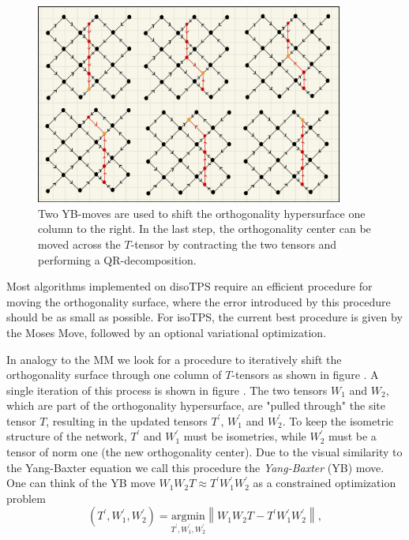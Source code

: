 \begin{figure}
	\centering
	\includegraphics[width=0.9\textwidth]{figures/Tensor_Networks/disoTPS_moving_ortho_surface.jpeg}
	\caption{Two YB-moves are used to shift the orthogonality hypersurface one column to the right. In the last step, the orthogonality center can be moved across the $T$-tensor by contracting the two tensors and performing a QR-decomposition.}
	\label{fig:disoTPS_moving_ortho_surface}
\end{figure}
Most algorithms implemented on disoTPS require an efficient procedure for moving the orthogonality surface, where the error introduced by this procedure should be as small as possible. For isoTPS, the current best procedure is given by the Moses Move, followed by an optional variational optimization. \par
In analogy to the MM we look for a procedure to iteratively shift the orthogonality surface through one column of $T$-tensors as shown in figure \figref{}. A single iteration of this process is shown in figure \figref{}. The two tensors $W_1$ and $W_2$, which are part of the orthogonality hypersurface, are "pulled through" the site tensor $T$, resulting in the updated tensors $T^\prime$, $W_1^\prime$ and $W_2^\prime$. To keep the isometric structure of the network, $T^\prime$ and $W_1^\prime$ must be isometries, while $W_2^\prime$ must be a tensor of norm one (the new orthogonality center). Due to the visual similarity to the Yang-Baxter equation we call this procedure the \textit{Yang-Baxter} (YB) move. One can think of the YB move $W_1W_2T \approx T^\prime W_1^\prime W_2^\prime$ as a constrained optimization problem
\begin{equation}
	\left(T^\prime, W_1^\prime, W_2^\prime\right) = \underset{T^\prime,W_1^\prime,W_2^\prime}{\text{argmin}}\left\lVert W_1W_2T - T^\prime W_1^\prime W_2^\prime\right\rVert,
\end{equation}
